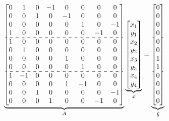 \documentclass[11pt]{article}
\begin{document}
\begin{equation}
\begin{array}{l}
    
\end{array}
\underbrace{
    \begin{bmatrix}
        0 & 1 & 0 & -1 & 0 & 0 & 0 & 0\\
        0 &  0 &  1 &   0 & -1  &  0 & 0  & 0  \\
        0 & 0 &  0 &   0 &  0 &  1 &  0 &  -1 \\
        1 &  0 &  0 &  0  &  0 & 0  & -1  & 0  \\
        \hdashline
        1 & 0 & 0 & 0 & 0 & 0 & 0 & 0\\
        0 & 1 & 0 & 0 & 0 & 0 & 0 & 0\\
        0 & 0 & 0 & 0 & 1 & 0 & 0 & 0\\
        0 & 0 & 0 & 0 & 0 & 1 & 0 & 0\\
        \hdashline
        1 & -1 & 0 & 0 & 0 & 0 & 0 & 0\\
        0 & 0 & 0 & 0 & 1 & -1 & 0 & 0\\
        0 & 0 & 1 & 0 & 0 & 0 & 0 & -1\\
        0 & 0 & 0 & 1 & 0 & 0 & -1 & 0\\
    \end{bmatrix}
}_{A}
\underbrace{
    \begin{bmatrix}
        x_1 \\
        y_1 \\
        x_2 \\
        y_2 \\
        x_3 \\
        y_3 \\
        x_4 \\
        y_4 \\
    \end{bmatrix}
}_{\vec{x}}
=
\underbrace{
    \begin{bmatrix}
        0 \\
        0 \\
        0 \\
        0 \\
        \hdashline
        0 \\
        0 \\ 
        1 \\ 
        1 \\ 
        \hdashline
        0 \\ 
        0 \\
        0 \\ 
        0 \\
    \end{bmatrix}
}_{\vec{b}}
\end{equation}
\end{document}
